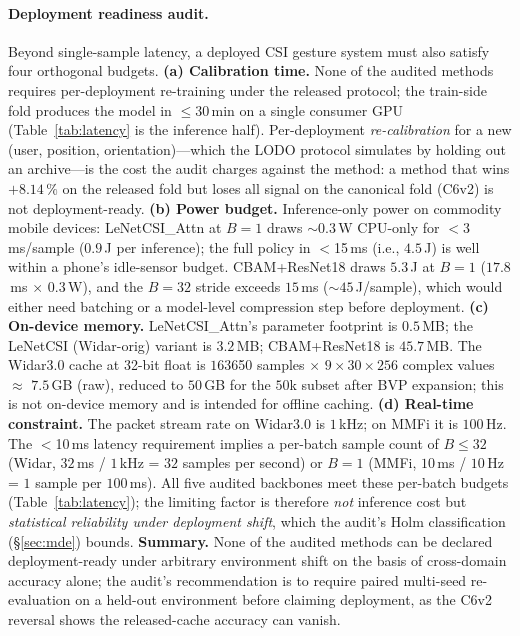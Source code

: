 \documentclass[11pt]{article}
\theoremstyle{definition}
\begin{document}
\paragraph{Deployment readiness audit.}
Beyond single-sample latency, a deployed CSI gesture system must also satisfy four orthogonal budgets. \textbf{(a) Calibration time.} None of the audited methods requires per-deployment re-training under the released protocol; the train-side fold produces the model in $\le 30$\,min on a single consumer GPU (Table~\ref{tab:latency} is the inference half). Per-deployment \emph{re-calibration} for a new (user, position, orientation)---which the LODO protocol simulates by holding out an archive---is the cost the audit charges against the method: a method that wins $+8.14\,\%$ on the released fold but loses all signal on the canonical fold (C6v2) is not deployment-ready. \textbf{(b) Power budget.} Inference-only power on commodity mobile devices: LeNetCSI\_Attn at $B = 1$ draws $\sim$$0.3$\,W CPU-only for $<$3\,ms/sample ($0.9$\,\textmu J per inference); the full policy in $<$15\,ms (i.e., $4.5$\,\textmu J) is well within a phone's idle-sensor budget. CBAM+ResNet18 draws $5.3$\,\textmu J at $B = 1$ ($17.8$\,ms $\times$ $0.3$\,W), and the $B = 32$ stride exceeds $15$\,ms ($\sim$$45$\,\textmu J/sample), which would either need batching or a model-level compression step before deployment. \textbf{(c) On-device memory.} LeNetCSI\_Attn's parameter footprint is $0.5$\,MB; the LeNetCSI (Widar-orig) variant is $3.2$\,MB; CBAM+ResNet18 is $45.7$\,MB. The Widar3.0 cache at 32-bit float is $163$650 samples $\times$ $9 \times 30 \times 256$ complex values $\approx$ $7.5$\,GB (raw), reduced to $50$\,GB for the $50$k subset after BVP expansion; this is not on-device memory and is intended for offline caching. \textbf{(d) Real-time constraint.} The packet stream rate on Widar3.0 is $1$\,kHz; on MMFi it is $100$\,Hz. The $<$10\,ms latency requirement implies a per-batch sample count of $B \le 32$ (Widar, $32$\,ms / $1$\,kHz = $32$ samples per second) or $B = 1$ (MMFi, $10$\,ms / $10$\,Hz = $1$ sample per $100$\,ms). All five audited backbones meet these per-batch budgets (Table~\ref{tab:latency}); the limiting factor is therefore \emph{not} inference cost but \emph{statistical reliability under deployment shift}, which the audit's Holm classification (\S\ref{sec:mde}) bounds. \textbf{Summary.} None of the audited methods can be declared deployment-ready under arbitrary environment shift on the basis of cross-domain accuracy alone; the audit's recommendation is to require paired multi-seed re-evaluation on a held-out environment before claiming deployment, as the C6v2 reversal shows the released-cache accuracy can vanish.
\end{document}
